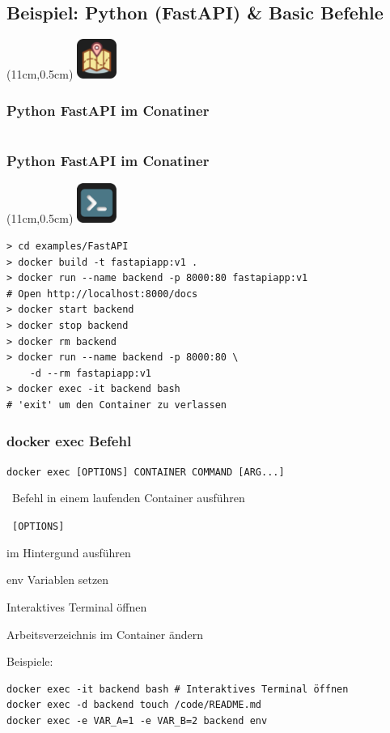 \documentclass[22pt]{beamer}
\newcommand{\code}[1]{\colorbox{darkgray!20}{\texttt{#1}}}
\newcommand{\desclabel}[1]{\textcolor{cyan}{#1}}
\newcommand{\codeTour}{
    \begin{textblock*}{1.3cm}(11cm,0.5cm) %
    \includegraphics[width=1.3cm]{Bilder/CodeTour.png}
    \end{textblock*}
}
\newcommand{\terminal}{
    \begin{textblock*}{1.3cm}(11cm,0.5cm) %
    \includegraphics[width=1.3cm]{Bilder/terminal2.png}
    \end{textblock*}
}
\begin{document}
\subsection{Beispiel: Python (FastAPI) \& Basic Befehle}
\begin{frame}[fragile]
    \codeTour
    \frametitle{Python FastAPI im Conatiner}

    \inputminted[fontsize=\footnotesize, frame=lines]{dockerfile}{../examples/FastAPI/Dockerfile}
\end{frame}

\begin{frame}[fragile]
    \frametitle{Python FastAPI im Conatiner}
    \terminal
\begin{verbatim}
> cd examples/FastAPI
> docker build -t fastapiapp:v1 .
> docker run --name backend -p 8000:80 fastapiapp:v1
# Open http://localhost:8000/docs
> docker start backend
> docker stop backend
> docker rm backend
> docker run --name backend -p 8000:80 \
    -d --rm fastapiapp:v1
> docker exec -it backend bash
# 'exit' um den Container zu verlassen
\end{verbatim}
\end{frame}

\begin{frame}[fragile]
    \frametitle{docker exec Befehl}
    \code{docker exec [OPTIONS] CONTAINER COMMAND [ARG...]}

    \-  \ Befehl in einem laufenden Container ausführen\vspace{5pt}

    \-  \ \code{[OPTIONS]}
    \begin{description}[labelindent=0.5cm, style=unboxed, labelwidth=\widthof{bla}, leftmargin=!]
        \item[\desclabel{-d}] im Hintergund ausführen
        \item[\desclabel{-e}] env Variablen setzen
        \item[\desclabel{-it}] Interaktives Terminal öffnen
        \item[\desclabel{-w, -\,-workdir string}] Arbeitsverzeichnis im Container ändern
        \item[...] 
    \end{description}

    Beispiele:
\begin{verbatim}
docker exec -it backend bash # Interaktives Terminal öffnen
docker exec -d backend touch /code/README.md
docker exec -e VAR_A=1 -e VAR_B=2 backend env
\end{verbatim}
    
\end{frame}
\end{document}
